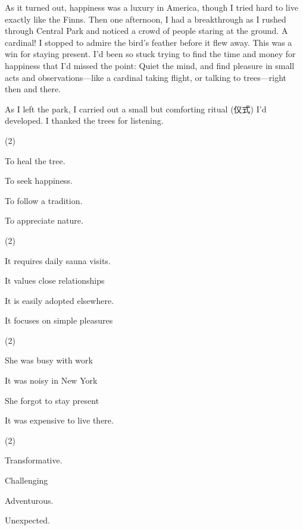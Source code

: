 \documentclass{英语试卷}
\begin{document}
\par As it turned out, happiness was a luxury in America, though I tried hard to live exactly like the Finns. Then one afternoon, I had a breakthrough as I rushed through Central Park and noticed a crowd of people staring at the ground. A cardinal! I stopped to admire the bird's feather before it flew away. This was a win for staying present. I'd been so stuck trying to find the time and money for happiness that I'd missed the point: Quiet the mind, and find pleasure in small acts and observations—like a cardinal taking flight, or talking to trees—right then and there.\par
\par As I left the park, I carried out a small but comforting ritual (仪式) I'd developed. I thanked the trees for listening.\par
{}
\begin{choices}(2)
  \item To heal the tree.
  \item To seek happiness.
  \item To follow a tradition.
  \item To appreciate nature.
\end{choices}
\begin{choices}(2)
  \item It requires daily sauna visits.
  \item It values close relationships
  \item It is easily adopted elsewhere.
  \item It focuses on simple pleasures
\end{choices}
\begin{choices}(2)
  \item She was busy with work
  \item It was noisy in New York
  \item She forgot to stay present
  \item It was expensive to live there.
\end{choices}
\begin{choices}(2)
  \item Transformative.
  \item Challenging
  \item Adventurous.
  \item Unexpected.
\end{choices}
\end{document}
